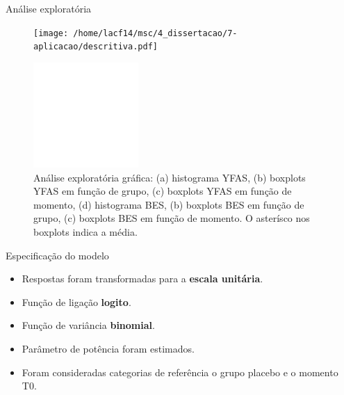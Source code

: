 \documentclass[
  ignorenonframetext,
  serif,
  professionalfont,
  usenames,
  dvipsnames,
  aspectratio = 169]{beamer}
\def\beginAThirdColumn{\begin{minipage}{0.31\textwidth}}%
\def\beginTwoThirdsColumn{\begin{minipage}{0.64\textwidth}}%
\def\endColumns{\end{minipage}}%
\begin{document}
\begin{frame}{Análise exploratória}
\protect\hypertarget{anuxe1lise-exploratuxf3ria}{}
\beginTwoThirdsColumn

\begin{figure}[H]
\centering
\texttt{[image: /home/lacf14/msc/4\_dissertacao/7-aplicacao/descritiva.pdf]}
\end{figure}

\endColumns\hfill
\beginAThirdColumn

\begin{figure}

{\centering \includegraphics[width=4cm]{defesa-lineu_files/figure-beamer/unnamed-chunk-3-1} 

}

\caption{Análise exploratória gráfica: (a) histograma YFAS, (b) boxplots YFAS em função de grupo, (c) boxplots YFAS em função de momento, (d) histograma BES, (b) boxplots BES em função de grupo, (c) boxplots BES em função de momento. O asterísco nos boxplots indica a média.}\label{fig:unnamed-chunk-3}
\end{figure}

\endColumns
\end{frame}

\begin{frame}{Especificação do modelo}
\protect\hypertarget{especificauxe7uxe3o-do-modelo}{}
\begin{itemize}
  \itemsep 2ex
  
  \item Respostas foram transformadas para a \textbf{escala unitária}. 

  \item Função de ligação \textbf{logito}.

  \item Função de variância \textbf{binomial}. 

  \item Parâmetro de potência foram estimados.

  \item Foram consideradas categorias de referência o grupo placebo e o momento T0.

\end{itemize}
\end{frame}
\end{document}
